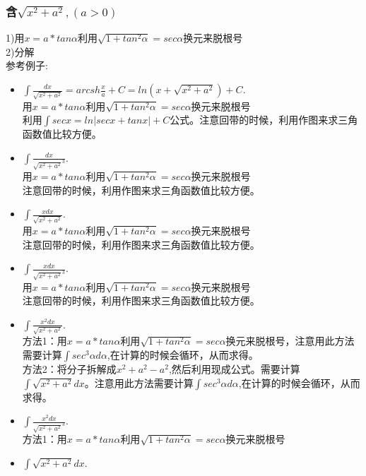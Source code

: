 \documentclass[fleqn]{article}
\begin{document}
\begin{flushleft}
		\subsubsection{含$\sqrt{x^2+a^2},(a>0)$}
		1)用$x=a*tan\alpha$利用$\sqrt{1+tan^2\alpha}=sec\alpha$换元来脱根号\\
		2)分解\\
		参考例子:\\
		\begin{itemize}
			\item $\int \frac{dx}{\sqrt{x^2+a^2}}=arcsh\frac{x}{a}+C=ln(x+\sqrt{x^2+a^2})+C$.\\
			用$x=a*tan\alpha$利用$\sqrt{1+tan^2\alpha}=sec\alpha$换元来脱根号\\
			利用$\int secx=ln|secx+tanx|+C$公式。注意回带的时候，利用作图来求三角函数值比较方便。
			\item $\int \frac{dx}{\sqrt{x^2+a^2}^3}$.\\
			用$x=a*tan\alpha$利用$\sqrt{1+tan^2\alpha}=sec\alpha$换元来脱根号\\
			注意回带的时候，利用作图来求三角函数值比较方便。
			\item $\int \frac{xdx}{\sqrt{x^2+a^2}}$.\\
			用$x=a*tan\alpha$利用$\sqrt{1+tan^2\alpha}=sec\alpha$换元来脱根号\\
			注意回带的时候，利用作图来求三角函数值比较方便。
			\item $\int \frac{xdx}{\sqrt{x^2+a^2}^3}$.\\
			用$x=a*tan\alpha$利用$\sqrt{1+tan^2\alpha}=sec\alpha$换元来脱根号\\
			注意回带的时候，利用作图来求三角函数值比较方便。
			\item $\int \frac{x^2dx}{\sqrt{x^2+a^2}}$.\\
			方法1：用$x=a*tan\alpha$利用$\sqrt{1+tan^2\alpha}=sec\alpha$换元来脱根号，注意用此方法需要计算$\int sec^3\alpha d\alpha$,在计算的时候会循环，从而求得。\\
			方法2：将分子拆解成$x^2+a^2-a^2$,然后利用现成公式。需要计算$\int \sqrt{x^2+a^2}dx$。注意用此方法需要计算$\int sec^3\alpha d\alpha$,在计算的时候会循环，从而求得。\\
			\item $\int \frac{x^2dx}{\sqrt{x^2+a^2}^3}$.\\
			方法1：用$x=a*tan\alpha$利用$\sqrt{1+tan^2\alpha}=sec\alpha$换元来脱根号\\
			\item $\int \sqrt{x^2+a^2}dx$.\\

\end{itemize}
\end{flushleft}
\end{document}
